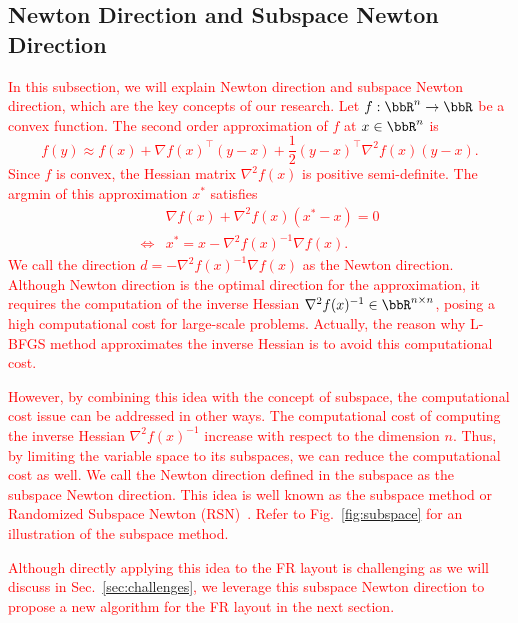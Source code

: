 \documentclass[dvipdfmx,journal]{IEEEtran}
\newcommand{\red}[1]{\textcolor{red}{#1}}
\begin{document}
\subsection{Newton Direction and Subspace Newton Direction}\label{ssec:introNewton}

\red{
    In this subsection, we will explain Newton direction and subspace Newton direction, which are the key concepts of our research.
    Let $f: \bbR^n \to \bbR$ be a convex function.
    The second order approximation of $f$ at $x \in \bbR^n$ is
    \begin{equation*}
        f(y) \approx f(x) + \nabla f(x)^\top (y - x) + \frac{1}{2} (y - x)^\top \nabla^2 f(x) (y - x).
    \end{equation*}
    Since $f$ is convex, the Hessian matrix $\nabla^2 f(x)$ is positive semi-definite.
    The argmin of this approximation $x^*$ satisfies
    \begin{align*}
             & \nabla f(x) + \nabla^2 f(x) (x^* - x) = 0 \\
        \iff & x^* = x - \nabla^2 f(x)^{-1} \nabla f(x).
    \end{align*}
    We call the direction $d = -\nabla^2 f(x)^{-1} \nabla f(x)$ as the Newton direction.
    Although Newton direction is the optimal direction for the approximation, it requires the computation of the inverse Hessian $\nabla^2 f(x)^{-1} \in \bbR^{n \times n}$, posing a high computational cost for large-scale problems. Actually, the reason why L-BFGS method approximates the inverse Hessian is to avoid this computational cost.
}

\red{
    However, by combining this idea with the concept of subspace, the computational cost issue can be addressed in other ways.
    The computational cost of computing the inverse Hessian $\nabla^2 f(x)^{-1}$ increase with respect to the dimension $n$. Thus, by limiting the variable space to its subspaces, we can reduce the computational cost as well.
    We call the Newton direction defined in the subspace as the subspace Newton direction.
    This idea is well known as the subspace method or Randomized Subspace Newton (RSN)~\cite{NEURIPS2019_bc6dc48b}.
    Refer to Fig.~\ref{fig:subspace} for an illustration of the subspace method.
}

\red{
    Although directly applying this idea to the FR layout is challenging as we will discuss in Sec.~\ref{sec:challenges}, we leverage this subspace Newton direction to propose a new algorithm for the FR layout in the next section.
}
\end{document}
